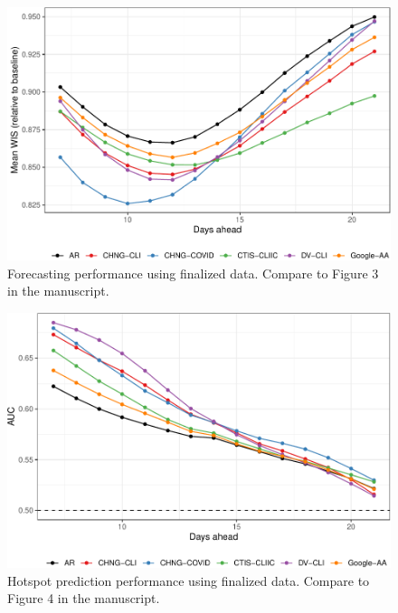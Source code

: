 




\begin{figure}

{\centering \includegraphics[width=\textwidth]{fig/fcast-finalized-1} 

}

\caption{Forecasting performance using finalized data. Compare to Figure 3 in the manuscript.}\label{fig:fcast-finalized}
\end{figure}

\clearpage

\begin{figure}

{\centering \includegraphics[width=\textwidth]{fig/hot-finalized-1} 

}

\caption{Hotspot prediction performance using finalized data. Compare to Figure 4 in the manuscript.}\label{fig:hot-finalized}
\end{figure}

